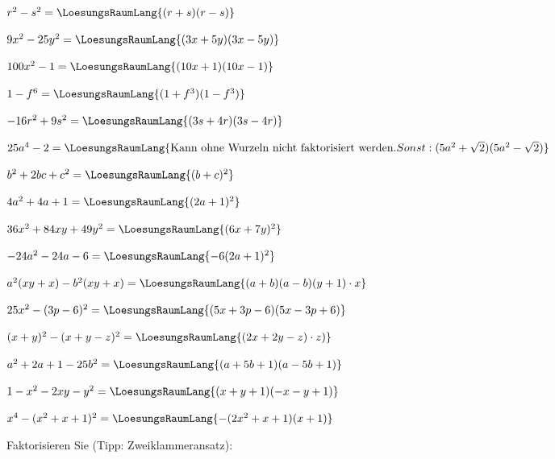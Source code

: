 \begin{bbwAufgabenBlock}
\item $r^2-s^2 = \LoesungsRaumLang{(r+s)(r-s)}$
\item $9x^2 - 25y^2 = \LoesungsRaumLang{(3x+5y)(3x-5y)}$
\item $100x^2 -1 = \LoesungsRaumLang{(10x+1)(10x-1)}$
\item $1-f^6 = \LoesungsRaumLang{(1+f^3)(1-f^3)}$\noTRAINER{\newpage}
\item $-16r^2 + 9s^2 = \LoesungsRaumLang{(3s+4r)(3s-4r)}$
\item $25a^4-2 =  \LoesungsRaumLang{\textrm{Kann ohne Wurzeln nicht faktorisiert werden}. Sonst: (5a^2 + \sqrt{2})(5a^2-\sqrt{2})}$
\item $b^2+2bc+c^2 = \LoesungsRaumLang{(b+c)^2}$
\item $4a^2+4a+1 = \LoesungsRaumLang{(2a+1)^2}$\noTRAINER{\newpage}
\item $36x^2 + 84xy + 49y^2 = \LoesungsRaumLang{(6x+7y)^2}$
\item $-24a^2 - 24a -6 = \LoesungsRaumLang{-6(2a+1)^2}$
\item $a^2(xy+x) - b^2(xy+x) = \LoesungsRaumLang{(a+b)(a-b)(y+1)\cdot{}x}$
\item $25x^2 - (3p-6)^2 = \LoesungsRaumLang{(5x+3p-6)(5x-3p+6)}$\noTRAINER{\newpage}
\item $(x+y)^2 - (x+y-z)^2 = \LoesungsRaumLang{(2x+2y-z)\cdot{}z)}$
\item $a^2+2a+1-25b^2 = \LoesungsRaumLang{(a+5b+1)(a-5b+1)}$
\item $1-x^2-2xy-y^2 = \LoesungsRaumLang{(x+y+1)(-x-y+1)}$
\item $x^4 - (x^2+x+1)^2 = \LoesungsRaumLang{-(2x^2+x+1)(x+1)}$
\end{bbwAufgabenBlock}

\newpage




Faktorisieren Sie (Tipp: Zweiklammeransatz):


